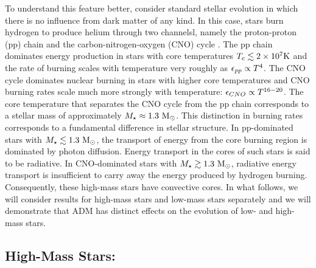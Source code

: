 \documentclass[useAMS,usenatbib]{mnras}
\begin{document}
  To understand this feature better, consider standard stellar evolution in which there is no influence from
  dark matter of any kind. In this case, stars burn hydrogen to produce helium through two channelsl, namely
  the proton-proton (pp) chain and the carbon-nitrogen-oxygen (CNO) cycle
  . The pp chain dominates energy
  production in stars with core temperatures $T_c \lesssim 2 \times 10^7 \mathrm{K}$ and the
  rate of burning scales with temperature very roughly as $\epsilon_{pp} \propto T^4$. The CNO
  cycle dominates nuclear burning in stars with higher core temperatures and CNO burning rates scale
  much more strongly with temperature: $\epsilon_{CNO} \propto T^{16-20}$. The core temperature
  that separates the CNO cycle from the pp chain corresponds to a stellar mass of approximately
  $M_{\star} \approx 1.3 \ \mathrm{M}_{\odot}$. This distinction in burning rates corresponds to a fundamental
  difference in stellar structure. In pp-dominated stars with $M_{\star} \lesssim 1.3 \ \mathrm{M}_{\odot}$,
  the transport of energy from the core burning region
  is dominated by photon diffusion. Energy transport in the cores of such stars
  is said to be radiative. In CNO-dominated stars with $M_{\star} \gtrsim 1.3 \ \mathrm{M}_{\odot}$,
  radiative energy transport is insufficient to carry away the energy produced by hydrogen burning.
  Consequently, these high-mass stars have convective cores. In what follows, we will consider
  results for high-mass stars and low-mass stars separately and we will demonstrate that ADM
  has distinct effects on the evolution of low- and high-mass stars.

\subsection{High-Mass Stars: \mrangehigh}
\label{sub:highmass}
\end{document}
